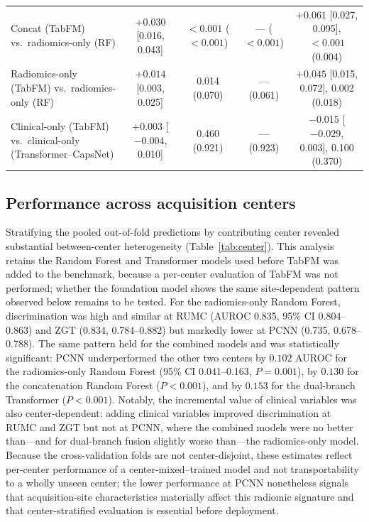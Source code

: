 \documentclass[11pt]{article}
\begin{document}
\begin{table}[!htbp]
{\begin{tabular}{lcccc}
Concat (TabFM) vs.\ radiomics-only (RF) & $+0.030$ [0.016, 0.043] & $<0.001$ ($<0.001$) & --- ($<0.001$) & $+0.061$ [0.027, 0.095], $<0.001$ (0.004) \\
Radiomics-only (TabFM) vs.\ radiomics-only (RF) & $+0.014$ [0.003, 0.025] & 0.014 (0.070) & --- (0.061) & $+0.045$ [0.015, 0.072], 0.002 (0.018) \\
Clinical-only (TabFM) vs.\ clinical-only (Transformer--CapsNet) & $+0.003$ [$-0.004$, 0.010] & 0.460 (0.921) & --- (0.923) & $-0.015$ [$-0.029$, 0.003], 0.100 (0.370) \\
\bottomrule
\end{tabular}
}
\end{table}

\subsection{Performance across acquisition centers}
\label{sec:res-center}

Stratifying the pooled out-of-fold predictions by contributing center revealed
substantial between-center heterogeneity (Table~\ref{tab:center}). This
analysis retains the Random Forest and Transformer models used before TabFM was
added to the benchmark, because a per-center evaluation of TabFM was not
performed; whether the foundation model shows the same site-dependent pattern
observed below remains to be tested. For the radiomics-only Random Forest,
discrimination was high and similar at RUMC (AUROC
0.835, 95\% CI 0.804--0.863) and ZGT (0.834, 0.784--0.882) but markedly lower at
PCNN (0.735, 0.678--0.788). The same pattern held for the combined models and was
statistically significant: PCNN underperformed the other two centers by
$0.102$ AUROC for the radiomics-only Random Forest (95\% CI 0.041--0.163,
$P=0.001$), by $0.130$ for the concatenation Random Forest
($P<0.001$), and by $0.153$ for the dual-branch Transformer ($P<0.001$). Notably,
the incremental value of clinical variables was also center-dependent: adding
clinical variables improved discrimination at RUMC and ZGT but not at PCNN, where
the combined models were no better than---and for dual-branch fusion slightly
worse than---the radiomics-only model. Because the cross-validation folds are not
center-disjoint, these estimates reflect per-center performance of a
center-mixed--trained model and not transportability to a wholly unseen center;
the lower performance at PCNN nonetheless signals that acquisition-site
characteristics materially affect this radiomic signature and that
center-stratified evaluation is essential before deployment.
\end{document}
